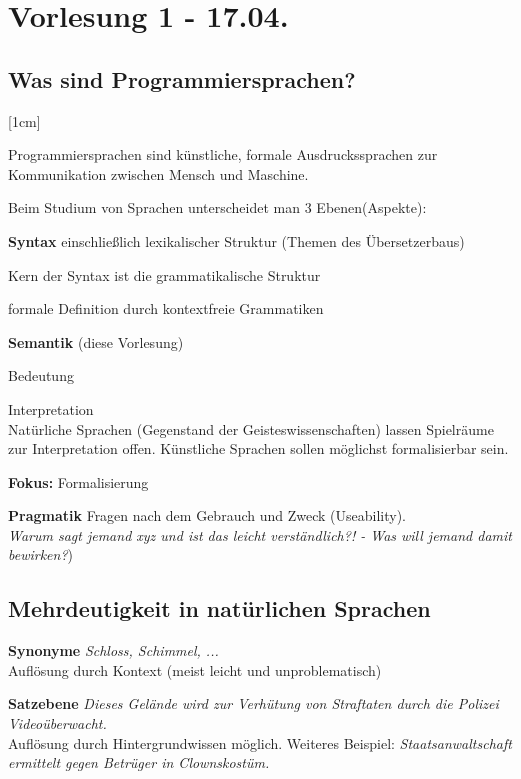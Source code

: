 \section{Vorlesung 1 - 17.04.}
\subsection{Was sind Programmiersprachen?}
[1cm]
\begin{defn}[Programmiersprachen]
Programmiersprachen sind künstliche, formale Ausdruckssprachen zur Kommunikation zwischen Mensch und Maschine.
\end{defn}
Beim Studium von Sprachen unterscheidet man 3 Ebenen(Aspekte):
\begin{compactitem}
	\item [\textbf{Syntax}] einschließlich lexikalischer Struktur (Themen des Übersetzerbaus)
	\begin{compactitem}
		\item Kern der Syntax ist die grammatikalische Struktur
		\item formale Definition durch kontextfreie Grammatiken
	\end{compactitem}
	\item [\textbf{Semantik}] (diese Vorlesung)
	\begin{compactitem}
		\item Bedeutung
		\item Interpretation \\
		Natürliche Sprachen (Gegenstand der Geisteswissenschaften) lassen Spielräume zur Interpretation offen. Künstliche Sprachen sollen möglichst formalisierbar sein.
		\item [\textbf{Fokus:}] Formalisierung
	\end{compactitem}
	\item [\textbf{Pragmatik}] Fragen nach dem Gebrauch und Zweck (Useability).\\ 
	\emph{Warum sagt jemand xyz und ist das leicht verständlich?! - Was will jemand damit bewirken?})
\end{compactitem}
\subsection{Mehrdeutigkeit in natürlichen Sprachen}
\begin{compactitem}
	\item [\textbf{Synonyme}] \emph{Schloss, Schimmel, ...}\\
	Auflösung durch Kontext (meist leicht und unproblematisch)
	\item [\textbf{Satzebene}] \emph{Dieses Gelände wird zur Verhütung von Straftaten durch die Polizei Videoüberwacht.}\\
	Auflösung durch Hintergrundwissen möglich. Weiteres Beispiel: \emph{Staatsanwaltschaft ermittelt gegen Betrüger in Clownskostüm.}
\end{compactitem}

